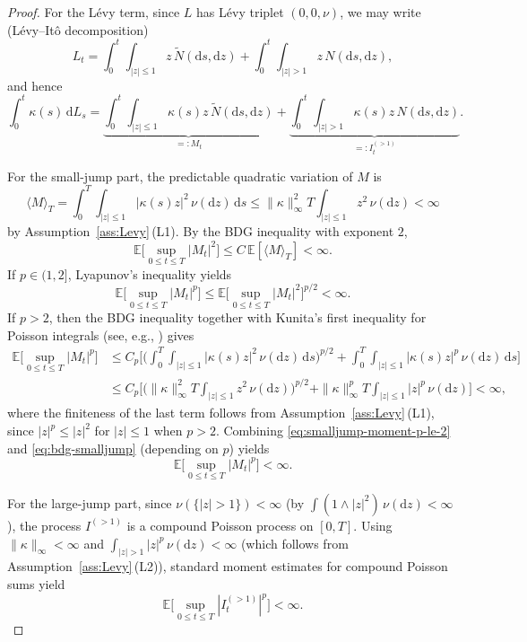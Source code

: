 \documentclass[11pt]{article}
\newcommand{\E}{\mathbb{E}}
\newcommand{\1}{\mathbf{1}}
\newcommand{\dd}{\mathrm{d}}
\theoremstyle{plain}
\theoremstyle{definition}
\theoremstyle{remark}
\begin{document}
\begin{proof}
\medskip
\noindent For the L\'evy term, since $L$ has L\'evy triplet $(0,0,\nu)$, we may write (L\'evy--It\^o decomposition)
\[
L_t=\int_0^t\int_{|z|\le 1} z\,\tilde N(\dd s,\dd z)+\int_0^t\int_{|z|>1} z\,N(\dd s,\dd z),
\]
and hence
\[
\int_0^t \kappa(s)\,\dd L_s
=\underbrace{\int_0^t\int_{|z|\le 1} \kappa(s)z\,\tilde N(\dd s,\dd z)}_{=:M_t}
+\underbrace{\int_0^t\int_{|z|>1} \kappa(s)z\,N(\dd s,\dd z)}_{=:I_t^{(>1)}}.
\]

\smallskip
\noindent For the small-jump part, the predictable quadratic variation of $M$ is
\[
\langle M\rangle_T=\int_0^T\int_{|z|\le 1} |\kappa(s)z|^2\,\nu(\dd z)\,\dd s
\le \|\kappa\|_\infty^2T\int_{|z|\le 1} z^2\,\nu(\dd z)<\infty
\]
by Assumption~\ref{ass:Levy}\,(L1).
By the BDG inequality with exponent $2$,
\[
\E\Big[\sup_{0\le t\le T}|M_t|^2\Big]\le C\,\E[\langle M\rangle_T]<\infty.
\]
If $p\in(1,2]$, Lyapunov's inequality yields
\begin{equation}\label{eq:smalljump-moment-p-le-2}
\E\Big[\sup_{0\le t\le T}|M_t|^p\Big]\le \E\Big[\sup_{0\le t\le T}|M_t|^2\Big]^{p/2}<\infty.
\end{equation}
If $p>2$, then the BDG inequality together with Kunita's first inequality for Poisson integrals (see, e.g., \cite[Theorem~4.4.23]{Applebaum2009}) gives
\begin{equation}\label{eq:bdg-smalljump}
\begin{aligned}
\E\Big[\sup_{0\le t\le T}|M_t|^p\Big]
&\le C_p\bigg[\Big(\int_0^T\int_{|z|\le 1} |\kappa(s)z|^2\,\nu(\dd z)\,\dd s\Big)^{p/2}
+\int_0^T\int_{|z|\le 1} |\kappa(s)z|^p\,\nu(\dd z)\,\dd s\bigg]\\
&\le C_p\bigg[\Big(\|\kappa\|_\infty^2T\int_{|z|\le 1} z^2\,\nu(\dd z)\Big)^{p/2}
+\|\kappa\|_\infty^p T\int_{|z|\le 1} |z|^p\,\nu(\dd z)\bigg]
<\infty,
\end{aligned}
\end{equation}
where the finiteness of the last term follows from Assumption~\ref{ass:Levy}\,(L1), since
$|z|^p\le |z|^2$ for $|z|\le 1$ when $p>2$.
Combining \eqref{eq:smalljump-moment-p-le-2} and \eqref{eq:bdg-smalljump} (depending on $p$) yields
\begin{equation}\label{eq:smalljump-moment}
\E\Big[\sup_{0\le t\le T}|M_t|^p\Big]<\infty.
\end{equation}

\smallskip
\noindent For the large-jump part, since $\nu(\{|z|>1\})<\infty$ (by $\int (1\wedge |z|^2)\,\nu(\dd z)<\infty$), the process
$I^{(>1)}$ is a compound Poisson process on $[0,T]$.
Using $\|\kappa\|_\infty<\infty$ and $\int_{|z|>1}|z|^p\,\nu(\dd z)<\infty$ (which follows from Assumption~\ref{ass:Levy}\,(L2)),
standard moment estimates for compound Poisson sums yield
\begin{equation}\label{eq:bigjump-moment}
\E\Big[\sup_{0\le t\le T}|I_t^{(>1)}|^p\Big]<\infty.
\end{equation}


\end{proof}
\end{document}
